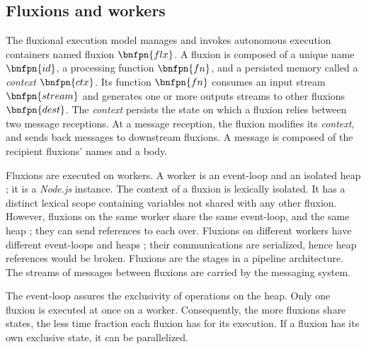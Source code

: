 \subsection{Fluxions and workers}

The fluxional execution model manages and invokes autonomous execution containers named fluxion $\bnfpn{flx}$.
A fluxion is composed of a unique name $\bnfpn{id}$, a processing function $\bnfpn{fn}$, and a persisted memory called a \textit{context} $\bnfpn{ctx}$.
Its function $\bnfpn{fn}$ consumes an input stream $\bnfpn{stream}$ and generates one or more outputs streams to other fluxions $\bnfpn{dest}$.
The \textit{context} persists the state on which a fluxion relies between two message receptions.
At a message reception, the fluxion modifies its \textit{context}, and sends back messages to downstream fluxions.
A message is composed of the recipient fluxions' names and a body.

Fluxions are executed on workers.
A worker is an event-loop and an isolated heap ; it is a \textit{Node.js} instance.
The context of a fluxion is lexically isolated.
It has a distinct lexical scope containing variables not shared with any other fluxion.
However, fluxions on the same worker share the same event-loop, and the same heap ; they can send references to each over.
Fluxions on different workers have different event-loops and heaps ; their communications are serialized, hence heap references would be broken.
Fluxions are the stages in a pipeline architecture.
The streams of messages between fluxions are carried by the messaging system.

The event-loop assures the exclusivity of operations on the heap.
Only one fluxion is executed at once on a worker.
Consequently, the more fluxions share states, the less time fraction each fluxion has for its execution.
If a fluxion has its own exclusive state, it can be parallelized.

